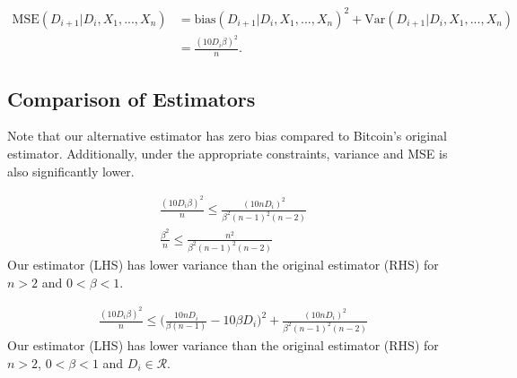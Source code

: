 \begin{align}
\text{MSE}(D_{i+1}|D_i,X_1,...,X_n) &= \text{bias}(D_{i+1}|D_i,X_1,...,X_n)^2 + \text{Var}(D_{i+1}|D_i,X_1,...,X_n) \\
&= \frac{(10 D_i\beta)^2}{n}.
\end{align}

\subsection{Comparison of Estimators}
Note that our alternative estimator has zero bias compared to Bitcoin's original estimator. Additionally, under the appropriate constraints, variance and MSE is also significantly lower.
\par \noindent {}
\begin{align}
\frac{(10 D_i\beta)^2}{n} \leq \frac{(10n D_i)^2}{\beta^2(n-1)^2(n-2)} \\
\frac{\beta^2}{n} \leq \frac{n^2}{\beta^2(n-1)^2(n-2)} 
\end{align}
Our estimator (LHS) has lower variance than the original estimator (RHS) for $n>2$ and $0<\beta<1$.

\begin{align}
\frac{(10 D_i\beta)^2}{n} \leq \Bigg(\frac{10n D_i}{\beta(n-1)} - 10\beta D_i\Bigg)^2 + \frac{(10n D_i)^2}{\beta^2(n-1)^2(n-2)}
\end{align}
Our estimator (LHS) has lower variance than the original estimator (RHS) for $n>2$, $0<\beta<1$ and $D_i \in \mathcal{R}$. 


